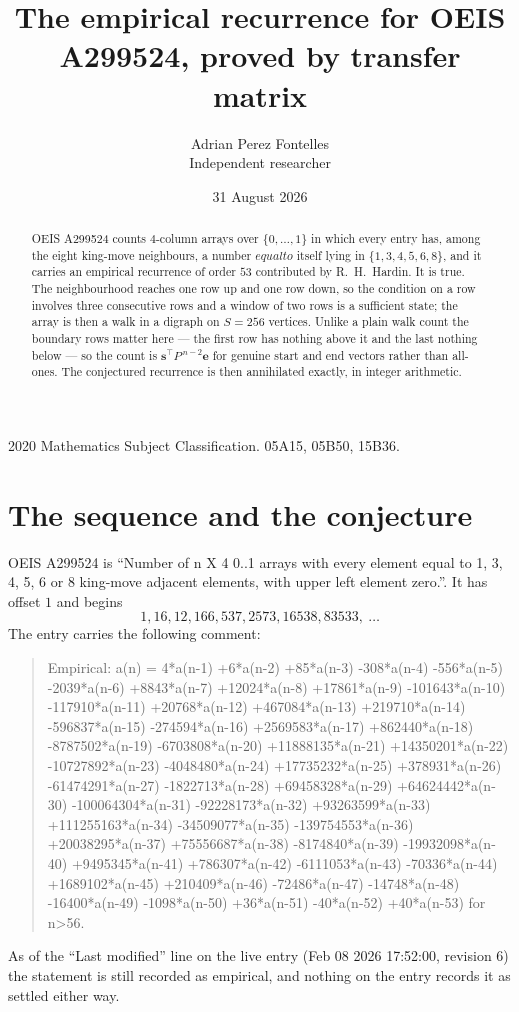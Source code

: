 \documentclass[11pt,a4paper]{article}
\title{The empirical recurrence for OEIS A299524, proved by transfer matrix}
\author{Adrian Perez Fontelles\\ \small Independent researcher}
\date{31 August 2026}
\theoremstyle{plain}
\theoremstyle{definition}
\begin{document}
\maketitle

\begin{abstract}
OEIS A299524 counts $4$-column arrays over $\{0,\dots,1\}$ in which every entry has,
among the eight king-move neighbours, a number $equal to$ itself lying in $\{1,3,4,5,6,8\}$, and it carries an empirical
recurrence of order $53$ contributed by R.~H.~Hardin. It is true. The neighbourhood
reaches one row up and one row down, so the condition on a row involves three consecutive
rows and a window of two rows is a sufficient state; the array is then a walk in a digraph
on $S=256$ vertices. Unlike a plain walk count the boundary rows matter here --- the first
row has nothing above it and the last nothing below --- so the count is
$\mathbf{s}^{\!\top}P^{\,n-2}\mathbf{e}$ for genuine start and end vectors rather than
all-ones. The conjectured recurrence is then annihilated exactly, in integer arithmetic.
\end{abstract}

\noindent\small 2020 Mathematics Subject Classification. 05A15, 05B50, 15B36.\normalsize

\section{The sequence and the conjecture}

OEIS A299524 is ``Number of n X 4 0..1 arrays with every element equal to 1, 3, 4, 5, 6 or 8 king-move adjacent elements, with upper left element zero.''. It has offset
$1$ and begins
\[
1, 16, 12, 166, 537, 2573, 16538, 83533,\ \dots
\]
The entry carries the following comment:
\begin{quote}\small
Empirical: a(n) = 4*a(n-1) +6*a(n-2) +85*a(n-3) -308*a(n-4) -556*a(n-5) -2039*a(n-6) +8843*a(n-7) +12024*a(n-8) +17861*a(n-9) -101643*a(n-10) -117910*a(n-11) +20768*a(n-12) +467084*a(n-13) +219710*a(n-14) -596837*a(n-15) -274594*a(n-16) +2569583*a(n-17) +862440*a(n-18) -8787502*a(n-19) -6703808*a(n-20) +11888135*a(n-21) +14350201*a(n-22) -10727892*a(n-23) -4048480*a(n-24) +17735232*a(n-25) +378931*a(n-26) -61474291*a(n-27) -1822713*a(n-28) +69458328*a(n-29) +64624442*a(n-30) -100064304*a(n-31) -92228173*a(n-32) +93263599*a(n-33) +111255163*a(n-34) -34509077*a(n-35) -139754553*a(n-36) +20038295*a(n-37) +75556687*a(n-38) -8174840*a(n-39) -19932098*a(n-40) +9495345*a(n-41) +786307*a(n-42) -6111053*a(n-43) -70336*a(n-44) +1689102*a(n-45) +210409*a(n-46) -72486*a(n-47) -14748*a(n-48) -16400*a(n-49) -1098*a(n-50) +36*a(n-51) -40*a(n-52) +40*a(n-53) for n>56.
\end{quote}
As of the ``Last modified'' line on the live entry (Feb 08 2026 17:52:00, revision
6) the statement is still recorded as empirical, and nothing on the entry
records it as settled either way.
\end{document}
